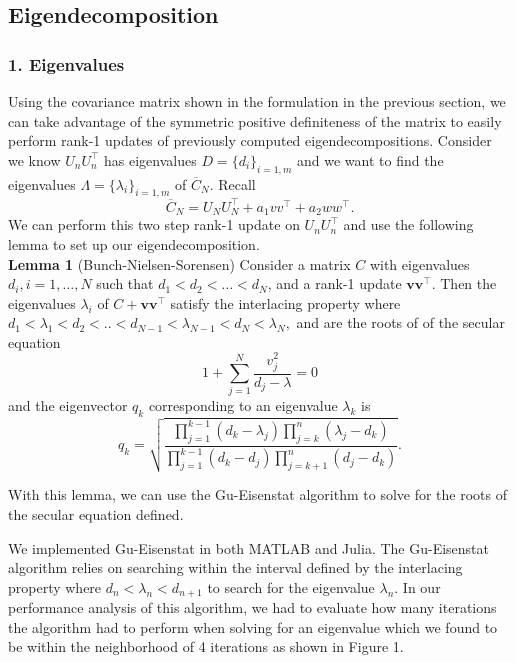 \documentclass[onecolumn]{webofc}
\begin{document}
\subsection{Eigendecomposition}
\subsubsection*{1. Eigenvalues}
Using the covariance matrix shown in the formulation in the previous section, we can take advantage of the symmetric positive definiteness of the matrix to easily perform rank-1 updates of previously computed eigendecompositions.
Consider we know $U_n U_n^{\top}$ has eigenvalues $D=\{d_i\}_{i=1,m}$ and we want to find the eigenvalues $\Lambda = \{\lambda_i\}_{i=1,m}$ of $ \overline{C}_{N}$. Recall 
\begin{equation}
\overline{C}_{N}=U_{N}U_{N}^{\top}+a_1v v^{\top}+a_2w w^{\top}.
\end{equation} We can perform this two step rank-1 update on $U_n U_n^{\top}$ and use the following lemma to set up our eigendecomposition.\\

\textbf{Lemma 1} (Bunch-Nielsen-Sorensen\cite{RefBNS}) Consider a matrix $C$ with eigenvalues $d_i, i=1,\ldots, N$ such that $d_1 < d_2 < … < d_N$, and a rank-1 update $\mathbf v\mathbf v^{\top}$. Then the eigenvalues $\lambda_i$ of $C+\mathbf v\mathbf v^{\top}$ satisfy the interlacing property where $
d_1<\lambda_1<d_2<..<d_{N-1}<\lambda_{N-1}<d_N<\lambda_N, 
$ and are the roots of of the secular equation
\begin{equation}\label{eq:sec}
1+\sum_{j=1}^N \frac{v_j^2}{d_j-\lambda}=0
\end{equation}
and the eigenvector $q_k$ corresponding to an eigenvalue $\lambda_k$ is
\begin{equation}
q_k=\sqrt{\dfrac{\prod\limits_{j=1}^{k-1}(d_k-\lambda_j) \prod\limits_{j=k}^{n}(\lambda_j-d_k)   }{\prod\limits_{j=1}^{k-1}(d_k-d_j) \prod\limits_{j=k+1}^{n}(d_j-d_k)   }
}.
\end{equation}

	With this lemma, we can use the Gu-Eisenstat algorithm\cite{RefD} to solve for the roots of the secular equation defined. 
	
	We implemented Gu-Eisenstat in both MATLAB and Julia. The Gu-Eisenstat algorithm relies on searching within the interval defined by the interlacing property where $d_n < \lambda_n < d_{n+1}$ to search for the eigenvalue $\lambda_n$. In our performance analysis of this algorithm, we had to evaluate how many iterations the algorithm had to perform when solving for an eigenvalue which we found to be within the neighborhood of 4 iterations as shown in Figure 1.
\end{document}
